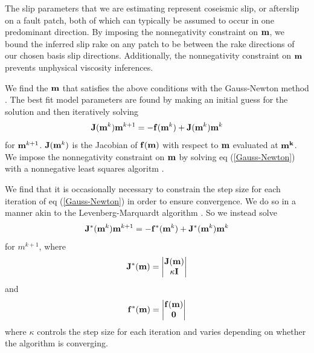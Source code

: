 \documentclass[12pt]{article}
\begin{document}
The slip parameters that we are estimating represent coseismic
slip, or afterslip on a fault patch, both of which can typically be
assumed to occur in one predominant direction.  By imposing the
nonnegativity constraint on $\bold{m}$, we bound the inferred slip
rake on any patch to be between the rake directions of our chosen
basis slip directions.  Additionally, the nonnegativity constraint on
$\bold{m}$ prevents unphysical viscosity inferences.

We find the $\bold{m}$ that satisfies the above conditions with the
Gauss-Newton method \citep{A2013}.  The best fit model parameters are
found by making an initial guess for the solution and then iteratively
solving
\begin{equation}\label{Gauss-Newton}
\bold{J}(\bold{m}^{k})\bold{m}^{k+1} = -\bold{f}(\bold{m}^k) + \bold{J}(\bold{m}^{k})\bold{m}^{k}
\end{equation}
for $\bold{m}^{k+1}$.  $\bold{J}(\bold{m}^k)$ is the Jacobian of
$\bold{f(m)}$ with respect to $\bold{m}$ evaluated at $\bold{m^k}$. We
impose the nonnegativity constraint on $\bold{m}$ by solving eq
(\ref{Gauss-Newton}) with a nonnegative least squares algoritm
\cite{LH1974}.

We find that it is occasionally necessary to constrain the step size
for each iteration of eq (\ref{Gauss-Newton}) in order to ensure
convergence.  We do so in a manner akin to the Levenberg-Marquardt
algorithm \citep{A2013}.  So we instead solve
\begin{equation}\label{Levenberg-Marquardt}
  \bold{J^*}(\bold{m}^k)\bold{m}^{k+1} = -\bold{f^*}(\bold{m}^k) + \bold{J^*}(\bold{m}^k)\bold{m}^k
\end{equation}
for $m^{k+1}$, where
\begin{equation}
  \bold{J^*}(\bold{m}) = 
      \begin{vmatrix}
      \bold{J}(\bold{m})\\
      \kappa\bold{I}
      \end{vmatrix}
\end{equation}
and
\begin{equation}
  \bold{f^*}(\bold{m}) = 
      \begin{vmatrix}
      \bold{f}(\bold{m})\\
      \bold{0}
      \end{vmatrix}
\end{equation}
where $\kappa$ controls the step size for each iteration and varies
depending on whether the algorithm is converging.  
\end{document}
